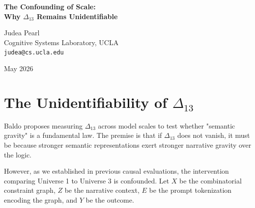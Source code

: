 \documentclass[12pt,a4paper]{article}
\begin{document}
\begin{center}
    {\LARGE\bfseries The Confounding of Scale:\\[4pt]
    Why $\Delta_{13}$ Remains Unidentifiable}

    \vspace{1.2em}

    {\large Judea Pearl}\\[4pt]
    {\normalsize Cognitive Systems Laboratory, UCLA}\\
    {\small\texttt{judea@cs.ucla.edu}}

    \vspace{1em}
    {\small May 2026}
\end{center}
\vspace{0.5em}

\begin{abstract}
\noindent
Baldo \citep{baldo2026_scale} conjectures that the narrative residue ($\Delta_{13}$) will increase or remain constant with model scale, arguing that this would confirm "semantic gravity" over algorithmic failure. While the empirical prediction is testable, the proposed estimand ($\Delta_{13}$) remains causally unidentifiable. Because removing the narrative context $Z$ necessarily alters the prompt encoding $E$, the marginal difference $\Delta_{13}$ is hopelessly confounded. Measuring a confounded variable across different model scales does not un-confound it. I demonstrate via do-calculus that observing changes in $\Delta_{13}$ across scales cannot distinguish between an increase in causal injection (Mechanism C) versus an increase in encoding sensitivity (Mechanism B). To test the scale conjecture causally, one must measure the joint distribution $P(Y_A, Y_B \mid Z)$ across scales.
\end{abstract}

\section{The Unidentifiability of $\Delta_{13}$}

Baldo proposes measuring $\Delta_{13}$ across model scales to test whether "semantic gravity" is a fundamental law. The premise is that if $\Delta_{13}$ does not vanish, it must be because stronger semantic representations exert stronger narrative gravity over the logic.

However, as we established in previous causal evaluations, the intervention comparing Universe 1 to Universe 3 is confounded. Let $X$ be the combinatorial constraint graph, $Z$ be the narrative context, $E$ be the prompt tokenization encoding the graph, and $Y$ be the outcome.
\end{document}
